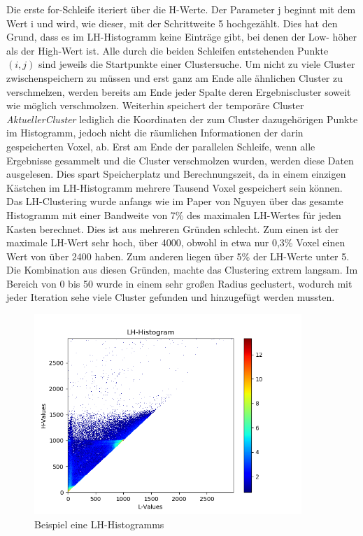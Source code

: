Die erste for-Schleife iteriert über die H-Werte. Der Parameter j beginnt mit dem Wert i und wird, wie dieser, mit der Schrittweite 5 hochgezählt. Dies hat den Grund, dass es im LH-Histogramm keine Einträge gibt, bei denen der Low- höher als der High-Wert ist. Alle durch die beiden Schleifen entstehenden Punkte $(i, j)$ sind jeweils die Startpunkte einer Clustersuche.
\newline
Um nicht zu viele Cluster zwischenspeichern zu müssen und erst ganz am Ende alle ähnlichen Cluster zu verschmelzen, werden bereits am Ende jeder Spalte deren Ergebniscluster soweit wie möglich verschmolzen.
\newline
Weiterhin speichert der temporäre Cluster \textit{AktuellerCluster} lediglich die Koordinaten der zum Cluster dazugehörigen Punkte im Histogramm, jedoch nicht die räumlichen Informationen der darin gespeicherten Voxel, ab. Erst am Ende der parallelen Schleife, wenn alle Ergebnisse gesammelt und die Cluster verschmolzen wurden, werden diese Daten ausgelesen. Dies spart Speicherplatz und Berechnungszeit, da in einem einzigen Kästchen im LH-Histogramm mehrere Tausend Voxel gespeichert sein können.
\newline
Das LH-Clustering wurde anfangs wie im Paper von Nguyen \cite{nguyen2012clustering} über das gesamte Histogramm mit einer Bandweite von 7\% des maximalen LH-Wertes für jeden Kasten berechnet. Dies ist aus mehreren Gründen schlecht. Zum einen ist der maximale LH-Wert sehr hoch, über 4000, obwohl in etwa nur 0,3\% Voxel einen Wert von über 2400 haben. Zum anderen liegen über 5\% der LH-Werte unter 5. Die Kombination aus diesen Gründen, machte das Clustering extrem langsam. Im Bereich von 0 bis 50  wurde in einem sehr großen Radius geclustert, wodurch mit jeder Iteration sehe viele Cluster gefunden und hinzugefügt werden mussten.


\begin{figure}[!h] 
\includegraphics[width=0.9\textwidth]{Logos/LHHistogram.png}
\caption{Beispiel eine LH-Histogramms} 
\label{fig:lh_histo} 
\end{figure}


